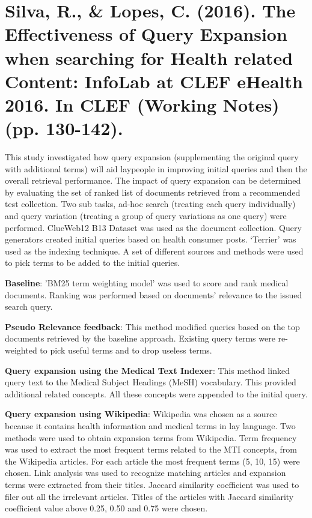 \documentclass[]{article}
\begin{document}
\section{Silva, R., \& Lopes, C. (2016). The Effectiveness of Query Expansion when searching for Health related Content: InfoLab at CLEF eHealth 2016. In CLEF (Working Notes) (pp. 130-142).}

This study investigated how query expansion (supplementing the original query with additional terms) will aid laypeople in improving initial queries and then the overall retrieval performance. The impact of query expansion can be determined by evaluating the set of ranked list of documents retrieved from a recommended test collection. Two sub tasks, ad-hoc search (treating each query individually) and query variation (treating a group of query variations as one query) were performed. ClueWeb12 B13 Dataset was used as the document collection. Query generators created initial queries based on health consumer posts. ‘Terrier’ was used as the indexing technique. A set of different sources and methods were used to pick terms to be added to the initial queries.        

\textbf{Baseline}: 'BM25 term weighting model' was used to score and rank medical documents. Ranking was performed based on documents' relevance to the issued search query. 

\textbf{Pseudo Relevance feedback}: This method modified queries based on the top documents retrieved by the baseline approach. Existing query terms were re-weighted to pick useful terms and to drop useless terms. 

\textbf{Query expansion using the Medical Text Indexer}: This method linked query text to the Medical Subject Headings (MeSH) vocabulary. This provided additional related concepts. All these concepts were appended to the initial query.  

\textbf{Query expansion using Wikipedia}: Wikipedia was chosen as a source because it contains health information and medical terms in lay language. Two methods were used to obtain expansion terms from Wikipedia. Term frequency was used to extract the most frequent terms related to the MTI concepts, from the Wikipedia articles. For each article the most frequent terms (5, 10, 15) were chosen. Link analysis was used to recognize matching articles and expansion terms were extracted from their titles. Jaccard similarity coefficient was used to filer out all the irrelevant articles. Titles of the articles with Jaccard similarity coefficient value above 0.25, 0.50 and 0.75 were chosen.             
\end{document}
